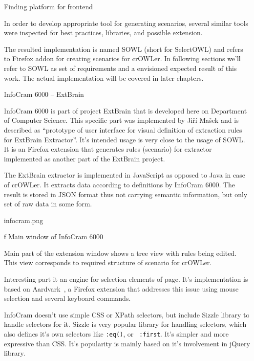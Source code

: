 %



\sec Finding platform for frontend

In order to develop appropriate tool for generating scenarios, several similar
tools were inspected for best practices, libraries, and possible extension. 

The resulted implementation is named SOWL (short for SelectOWL) and refers to
Firefox addon for creating scenarios for crOWLer. In following sections we'll
refer to SOWL as set of requirements and a envisioned expected result of this
work. The actual implementation will be covered in later chapters. 


\secc InfoCram 6000 -- ExtBrain

InfoCram 6000 is part of project ExtBrain 
that is developed here on Department of Computer Science. This specific part
was implemented by Jiří Mašek and is described as ``prototype of user
interface for visual definition of extraction rules for ExtBrain Extractor''.
It's intended usage is very close to the usage of SOWL. It is an Firefox
extension that generates rules (scenario) for extractor implemented as another
part of the ExtBrain project. 

The ExtBrain extractor is implemented in JavaScript as opposed to Java in case
of crOWLer. It extracts data according to definitions by InfoCram 6000. The
result is stored in JSON format thus not carrying semantic information, but
only set of raw data in some form. 

\midinsert
\picw=7cm \cinspic infocram.png
\caption/f Main window of InfoCram 6000
\endinsert

Main part of the extension window shows a tree view with rules being edited.
This view corresponds to required structure of scenario for crOWLer. 

Interesting part it an engine for selection elements of page. It's
implementation is based on
Aardvark~, a
Firefox extension that addresses this issue using mouse selection and several
keyboard commands. 

InfoCram doesn't use simple CSS or XPath selectors, but include Sizzle library
to handle selectors for it. Sizzle is very popular library for handling
selectors, which also defines it's own selectors like {\tt :eq()}, or {\tt
:first}. It's simpler and more expressive than CSS. It's popularity is 
mainly based on it's involvement in jQuery library. 

